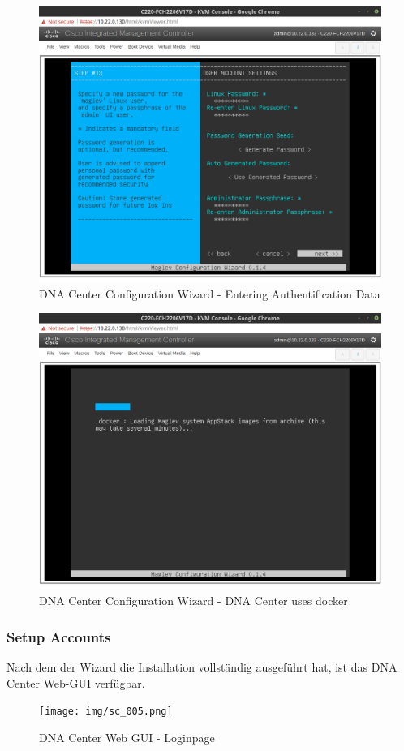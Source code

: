 \begin{figure}[H]
	\centering
	\includegraphics[height=9cm]{img/sc_003.png}
	\caption{DNA Center Configuration Wizard - Entering Authentification Data}
	\label{fig:dna-center-install-step-13}
\end{figure}

\begin{figure}[H]
	\centering
	\includegraphics[height=9cm]{img/sc_004.png}
	\caption{DNA Center Configuration Wizard - DNA Center uses docker}
	\label{fig:dna-center-install-step-install}
\end{figure}


\subsubsection{Setup Accounts}
Nach dem der Wizard die Installation vollständig ausgeführt hat, ist das DNA Center Web-GUI verfügbar.
\begin{figure}[H]
	\centering
	\texttt{[image: img/sc\_005.png]}
	\caption{DNA Center Web GUI - Loginpage}
	\label{fig:dna-center-gui-1}
\end{figure}

